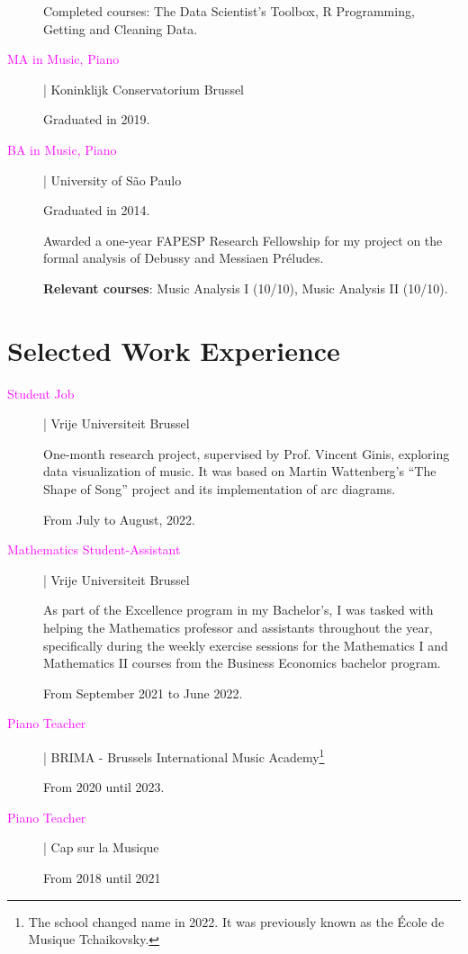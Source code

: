 \documentclass[12pt]{article}
\newcommand{\mycolor}{Fuchsia}
\newcommand{\thesectionicon}{}
\newcommand{\sectionicon}[1]{\renewcommand{\thesectionicon}{#1}}
\begin{document}
\begin{description}
Completed courses: The Data Scientist’s Toolbox, R Programming, Getting and Cleaning Data.  

\item[\textcolor{\mycolor}{MA in Music, Piano}] | Koninklijk Conservatorium Brussel

Graduated in 2019.

\item[\textcolor{\mycolor}{BA in Music, Piano}] | University of São Paulo

Graduated in 2014.

Awarded a one-year FAPESP Research Fellowship for my project on the formal analysis of Debussy and Messiaen Préludes.

\textbf{Relevant courses}: Music Analysis I (10/10), Music Analysis II (10/10).

\end{description}

\sectionicon{\faToolbox}
\section{Selected Work Experience}
\begin{description} 
\item[\textcolor{\mycolor}{Student Job}] | Vrije Universiteit Brussel

One-month research project, supervised by Prof. Vincent Ginis, exploring data visualization of music. It was based on Martin Wattenberg’s “The Shape of Song” project and its implementation of arc diagrams.
  
From July to August, 2022.

\item[\textcolor{\mycolor}{Mathematics Student-Assistant}] | Vrije Universiteit Brussel

As part of the Excellence program in my Bachelor’s, I was tasked with helping the Mathematics professor and assistants throughout the year, specifically during the weekly exercise sessions for the Mathematics I and Mathematics II courses from the Business Economics bachelor program.
  
From September 2021 to June 2022.
\\
\item[\textcolor{\mycolor}{Piano Teacher}] | BRIMA - Brussels International Music Academy\footnote{The school changed name in 2022. It was previously known as the École de Musique Tchaikovsky.}
  
From 2020 until 2023.

\item[\textcolor{\mycolor}{Piano Teacher}] | Cap sur la Musique

From 2018 until 2021

\end{description}
\end{document}
